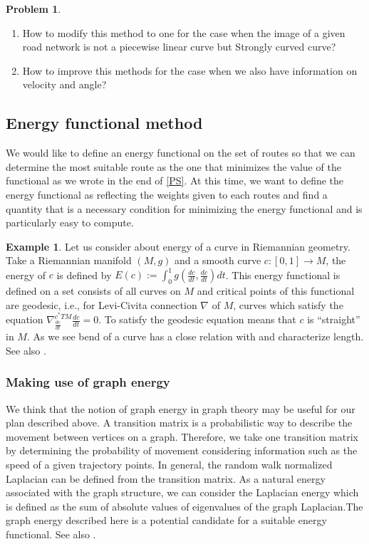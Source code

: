 \documentclass{article}
\numberwithin{equation}{section}
\theoremstyle{definition}
\newtheorem{example}[example]{Example}
\newtheorem{prob}[prob]{Problem}
\begin{document}
\begin{prob}
    \begin{enumerate}
        \item
        How to modify this method to one for the case when the image of a given road network is not a piecewise linear curve but Strongly curved curve?
        \item
        How to improve this methods for the case when we also have information on velocity and angle?
    \end{enumerate}
\end{prob}
\subsection{Energy functional method}

We would like to define an energy functional on the set of routes so that we can determine the most suitable route as the one that minimizes the value of the functional as we wrote in the end of \autoref{PS}.
At this time, we want to define the energy functional as reflecting the weights given to each routes and find a quantity that is a necessary condition for minimizing the energy functional and is particularly easy to compute.

\begin{example}
Let us consider about energy of a curve in Riemannian geometry.
Take a Riemannian manifold $(M,g)$ and a smooth curve $c:[0,1]\to M$, the energy of $c$ is defined by $E(c):=\int_{0}^{1}g(\frac{dc}{dt}, \frac{dc}{dt})dt$. This energy functional is defined on a set consists of all curves on $M$ and critical points of this functional are geodesic, i.e., for Levi-Civita connection $\nabla$ of $M$, curves which satisfy the equation $\nabla^{c^{*}TM}_{\frac{dc}{dt}}\frac{dc}{dt} = 0$. To satisfy the geodesic equation  means that $c$ is ``straight'' in $M$. As we see bend of a curve has a close relation with and characterize length.
See also \cite{Jo}.
\end{example}

\subsubsection*{Making use of graph energy}
We think that the notion of graph energy in graph theory may be useful for our plan described above.
A transition matrix is a probabilistic way to describe the movement between vertices on a graph. 
Therefore, we take one transition matrix by determining the probability of movement considering information such as the speed of a given trajectory points. 
In general, the random walk normalized Laplacian can be defined from the transition matrix.
As a natural energy associated with the graph structure, we can consider the Laplacian energy which is defined as the sum of absolute values of eigenvalues of the graph Laplacian.The graph energy described here is a potential candidate for a suitable energy functional. 
See also \cite{LSG}.
\end{document}
